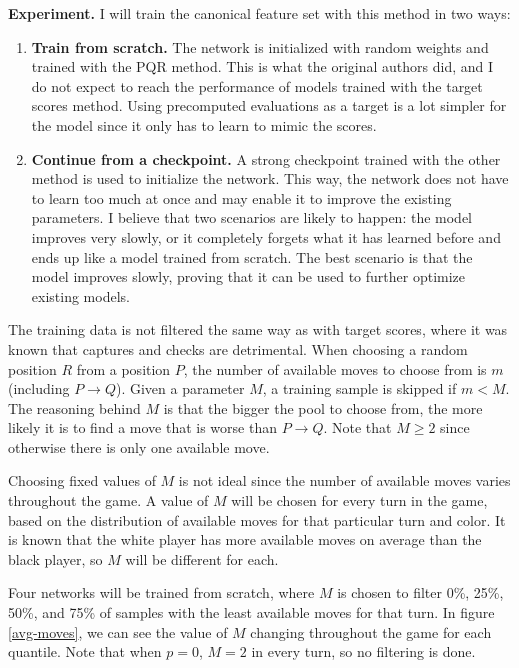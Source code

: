 \newpage
\textbf{Experiment.} I will train the canonical  feature set with this method in two ways:

\begin{enumerate}[label=\bf\Alph*.]
\item \textbf{Train from scratch.} The network is initialized with random weights and trained with the PQR method. This is what the original authors did, and I do not expect to reach the performance of models trained with the target scores method. Using precomputed evaluations as a target is a lot simpler for the model since it only has to learn to mimic the scores.

\item \textbf{Continue from a checkpoint.} A strong checkpoint trained with the other method is used to initialize the network. This way, the network does not have to learn too much at once and may enable it to improve the existing parameters. I believe that two scenarios are likely to happen: the model improves very slowly, or it completely forgets what it has learned before and ends up like a model trained from scratch. The best scenario is that the model improves slowly, proving that it can be used to further optimize existing models.
\end{enumerate}

The training data is not filtered the same way as with target scores, where it was known that captures and checks are detrimental. When choosing a random position $R$ from a position $P$, the number of available moves to choose from is $m$ (including $P \rightarrow Q$). Given a parameter $M$, a training sample is skipped if $m < M$. The reasoning behind $M$ is that the bigger the pool to choose from, the more likely it is to find a move that is worse than $P \rightarrow Q$. Note that $M \geq 2$ since otherwise there is only one available move.

Choosing fixed values of $M$ is not ideal since the number of available moves varies throughout the game. A value of $M$ will be chosen for every turn in the game, based on the distribution of available moves for that particular turn and color. It is known that the white player has more available moves on average than the black player, so $M$ will be different for each.

Four networks will be trained from scratch, where $M$ is chosen to filter 0\%, 25\%, 50\%, and 75\% of samples with the least available moves for that turn. In figure \ref{avg-moves}, we can see the value of $M$ changing throughout the game for each quantile. Note that when $p=0$, $M=2$ in every turn, so no filtering is done. \\

